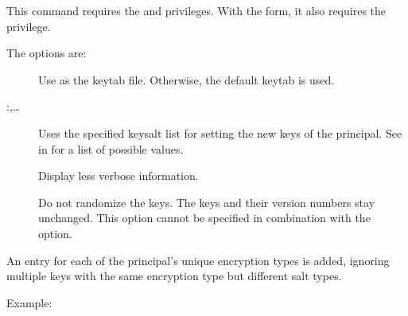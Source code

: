 \documentclass[letterpaper,10pt,english]{sphinxmanual}
\begin{document}
This command requires the  and  privileges.
With the  form, it also requires the  privilege.

The options are:
\begin{description}
\item[{ }] \leavevmode
Use  as the keytab file.  Otherwise, the default keytab is
used.

\item[{ :,…}] \leavevmode
Uses the specified keysalt list for setting the new keys of the
principal.  See {\hyperref[\detokenize{admin/conf_files/kdc_conf:keysalt-lists}]{}} in {\hyperref[\detokenize{admin/conf_files/kdc_conf:kdc-conf-5}]{}} for a
list of possible values.

\item[{}] \leavevmode
Display less verbose information.

\item[{}] \leavevmode
Do not randomize the keys. The keys and their version numbers stay
unchanged.  This option cannot be specified in combination with the
 option.

\end{description}

An entry for each of the principal’s unique encryption types is added,
ignoring multiple keys with the same encryption type but different
salt types.

Example:

%
\begin{sphinxVerbatim}[commandchars=\\\{\}]
    
      
          
\end{sphinxVerbatim}
\label{\detokenize{admin/admin_commands/kadmin_local:ktadd-end}}
\end{document}
